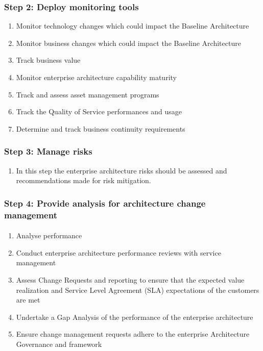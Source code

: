 \documentclass[aspectratio=169, table]{beamer}
\begin{document}
	\begin{frame}
		\frametitle{Step 2: Deploy monitoring tools}
		\vspace{20pt}
		\begin{enumerate}
			\item Monitor technology changes which could impact the Baseline Architecture
			\item Monitor business changes which could impact the Baseline Architecture
			\item Track business value
			\item Monitor enterprise architecture capability maturity
			\item Track and assess asset management programs
			\item Track the Quality of Service performances and usage
			\item Determine and track business continuity requirements
		\end{enumerate}

	\end{frame}

	\begin{frame}
		\frametitle{Step 3: Manage risks}
		\vspace{20pt}
		\begin{enumerate}
			\item In this step the enterprise architecture risks should be assessed and
			recommendations made for risk mitigation.
		\end{enumerate}
	\end{frame}

	\begin{frame}
		\frametitle{Step 4: Provide analysis for architecture change management}
		\framesubtitle{\hspace{1cm}}
		\vspace{20pt}
		\begin{enumerate}
			\item Analyse performance
			\item Conduct enterprise architecture performance reviews with service management
			\item Assess Change Requests and reporting to ensure that the expected value realization and Service Level Agreement (SLA) expectations of the customers are met
			\item Undertake a Gap Analysis of the performance of the enterprise architecture
			\item Ensure change management requests adhere to the enterprise Architecture Governance and framework
		\end{enumerate}

	\end{frame}
\end{document}
